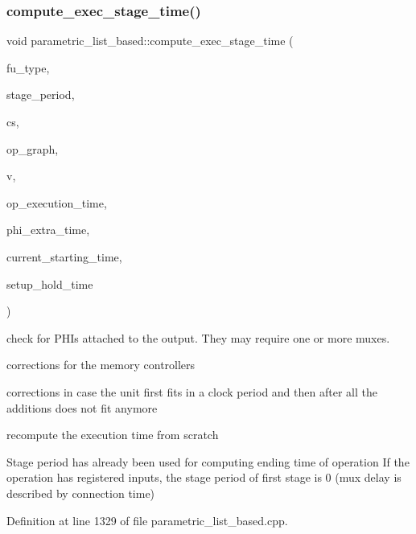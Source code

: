 \subsubsection{\texorpdfstring{compute\+\_\+exec\+\_\+stage\+\_\+time()}{compute\_exec\_stage\_time()}}
{\footnotesize\ttfamily void parametric\+\_\+list\+\_\+based\+::compute\+\_\+exec\+\_\+stage\+\_\+time (\begin{DoxyParamCaption}\item[{const unsigned int}]{fu\+\_\+type,  }\item[{double \&}]{stage\+\_\+period,  }\item[{const Control\+Step}]{cs,  }\item[{const \hyperlink{op__graph_8hpp_a9a0b240622c47584bee6951a6f5de746}{Op\+Graph\+Const\+Ref}}]{op\+\_\+graph,  }\item[{\hyperlink{graph_8hpp_abefdcf0544e601805af44eca032cca14}{vertex}}]{v,  }\item[{double \&}]{op\+\_\+execution\+\_\+time,  }\item[{double \&}]{phi\+\_\+extra\+\_\+time,  }\item[{double}]{current\+\_\+starting\+\_\+time,  }\item[{double}]{setup\+\_\+hold\+\_\+time }\end{DoxyParamCaption})\hspace{0.3cm}{\ttfamily [private]}}

check for P\+H\+Is attached to the output. They may require one or more muxes.

corrections for the memory controllers

corrections in case the unit first fits in a clock period and then after all the additions does not fit anymore

recompute the execution time from scratch

Stage period has already been used for computing ending time of operation If the operation has registered inputs, the stage period of first stage is 0 (mux delay is described by connection time) 

Definition at line 1329 of file parametric\+\_\+list\+\_\+based.\+cpp.



